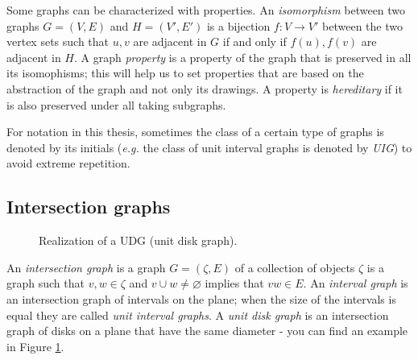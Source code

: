 Some graphs can be characterized with properties. An \emph{isomorphism} between two graphs $G= (V,E)$ and $H = (V', E')$ is a bijection $f : V \to V'$ between the two vertex sets such that $u,v$ are adjacent in $G$ if and only if $f(u), f(v)$ are adjacent in $H$. A graph \emph{property} is a property of the graph that is preserved in all its isomophisms; this will help us to set properties that are based on the abstraction of the graph and not only its drawings. A property is \emph{hereditary} if it is also preserved under all taking subgraphs.

For notation in this thesis, sometimes the class of a certain type of graphs is denoted by its initials (\textit{e.g.} the class of unit interval graphs is denoted by \emph{UIG}) to avoid extreme repetition.

\subsection{Intersection graphs}

\begin{figure}
\centering

\begin{scaletikzpicturetowidth}{\textwidth}
\end{scaletikzpicturetowidth}

\caption{Realization of a UDG (unit disk graph).}
\label{fig:udg}
\end{figure}


An \emph{intersection graph} is a graph $G = (\zeta,E)$ of a collection of objects $\zeta$ is a graph such that $v,w \in \zeta$ and $v \cup w \neq \varnothing$ implies that $vw \in E$. An \emph{interval graph} is an intersection graph of intervals on the plane; when the size of the intervals is equal they are called \emph{unit interval graphs}. A \emph{unit disk graph} is an intersection graph of disks on a plane that have the same diameter - you can find an example in Figure \ref{fig:udg}.\\

